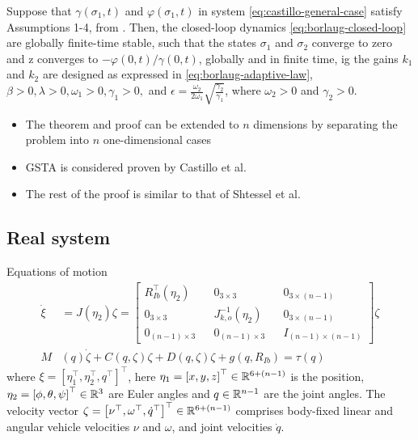 \begin{theorem}
    Suppose that $\gamma(\sigma_1, t)$ and $\varphi(\sigma_1, t)$ in system \eqref{eq:castillo-general-case} satisfy Assumptions 1-4, from \cite{Cas:18}. Then, the closed-loop dynamics \eqref{eq:borlaug-closed-loop} are globally finite-time stable, such that the states $\sigma_1$ and $\sigma_2$ converge to zero and z converges to $-\varphi(0, t)/\gamma(0,t)$, globally and in finite time, ig the gains $k_1$ and $k_2$ are designed as expressed in \eqref{eq:borlaug-adaptive-law}, $\beta > 0, \lambda > 0, \omega_1 > 0, \gamma_1 > 0,$ and $\epsilon= \frac{\omega_2}{2\omega_1}\sqrt{\frac{\gamma_2}{\gamma_1}}$, where $\omega_2 > 0$ and $\gamma_2 > 0$.
\end{theorem}
\begin{rmk}
    \begin{itemize}
        \item The theorem and proof can be extended to $n$ dimensions by separating the problem into $n$ one-dimensional cases
        \item GSTA is considered proven by Castillo et al. \cite{Cas:18}
        \item The rest of the proof is similar to that of Shtessel et al. \cite{Sht:10}
    \end{itemize}
\end{rmk}

\subsection{Real system}
Equations of motion
    \begin{equation}
    \begin{split}
        \dot{\xi} &= J(\eta_2)\zeta = 
    \begin{bmatrix}
        R_{Ib}^\top(\eta_2) && 0_{3 \times 3} && 0_{3 \times (n-1)} \\
        0_{3 \times 3} && J^{-1}_{k,o}(\eta_2) && 0_{3 \times (n-1)} \\
        0_{(n-1) \times 3} && 0_{(n-1) \times 3} && I_{(n-1) \times (n-1)}
    \end{bmatrix}\zeta \\
    M&(q)\dot{\zeta} + C(q, \zeta)\zeta + D(q, \zeta)\zeta + g(q, R_{Ib}) = \tau(q)
    \end{split}
\end{equation}
where $\xi = \left[\eta_1^\top, \eta_2^\top, q^\top\right]^\top$, here $\eta_1 = \left[x, y, z\right]^\top \in \mathbb{R}^{6+(n-1)}$ is the position, $\eta_2 = \left[\phi, \theta, \psi\right]^\top \in \mathbb{R}^3$ are Euler angles and $q \in \mathbb{R}^{n-1}$ are the joint angles. The velocity vector $\zeta = \left[\nu^\top, \omega^\top, \dot{q}^\top\right]^\top \in \mathbb{R}^{6+(n-1)}$ comprises body-fixed linear and angular vehicle velocities $\nu$ and $\omega$, and joint velocities $\dot{q}$.


